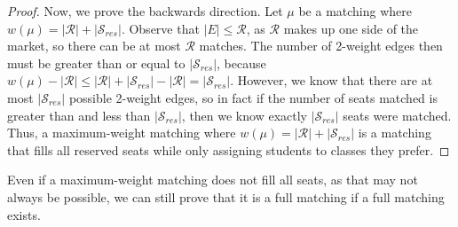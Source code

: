\begin{proof}
  Now, we prove the backwards direction. Let $\mu$ be a matching
  where $w(\mu) =  |\mathcal{R}| + |\mathcal{S}_{res}|$. Observe that $|E| \leq
  \mathcal{R}$, as $\mathcal{R}$ makes up one side of the market, so there can
  be at most $\mathcal{R}$ matches. The number of 2-weight edges then must be
  greater than or equal to 
  $|\mathcal{S}_{res}|$, because $w(\mu) - |\mathcal{R}| \leq |\mathcal{R}| +
  |\mathcal{S}_{res}| -  |\mathcal{R}| =  |\mathcal{S}_{res}|$. However, we know
  that there are at most $|\mathcal{S}_{res}|$ possible 2-weight edges, so in
  fact if the number of seats matched is greater than and less than
  $|\mathcal{S}_{res}|$, then we know exactly $|\mathcal{S}_{res}|$ seats were
  matched. Thus, a maximum-weight matching where $w(\mu) = |\mathcal{R}| +
  |\mathcal{S}_{res}|$ is a
  matching that fills all reserved seats while only assigning students to
  classes they prefer.
\end{proof}

Even if a maximum-weight matching does not fill all seats, as that may not always
be possible, we can still prove that it is a full matching if a full matching
exists.  

